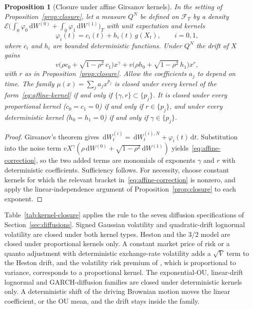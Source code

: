 \documentclass[11pt,a4paper]{article}
\newtheorem{proposition}{Proposition}[section]
\theoremstyle{definition}
\theoremstyle{remark}
\newcommand{\dd}{\,\mathrm{d}}
\begin{document}
\begin{proposition}[Closure under affine Girsanov kernels]
\label{prop:affine-closure}
In the setting of Proposition~\ref{prop:closure}, let a measure \(Q^N\) be defined on \(\mathcal F_T\) by a density
\(\mathcal E\bigl(\int_0^\cdot\varphi_0\dd W^{(0)}+\int_0^\cdot\varphi_1\dd W^{(1)}\bigr)_T\) with unit expectation and kernels
\begin{equation}
 \varphi_i(t)=c_i(t)+h_i(t)\,g(X_t),\qquad i=0,1,
 \label{eq:affine-kernel}
\end{equation}
where \(c_i\) and \(h_i\) are bounded deterministic functions. Under \(Q^N\) the drift of \(X\) gains
\begin{equation}
 v\bigl(\rho c_0+\sqrt{1-\rho^2}\,c_1\bigr)x^{\gamma}
 +v\bigl(\rho h_0+\sqrt{1-\rho^2}\,h_1\bigr)x^{r},
 \label{eq:affine-correction}
\end{equation}
with \(r\) as in Proposition~\ref{prop:closure}. Allow the coefficients \(a_j\) to depend on time. The family \(\mu(x)=\sum_ja_jx^{p_j}\) is closed under every kernel of the form~\eqref{eq:affine-kernel} if and only if \(\{\gamma,r\}\subset\{p_j\}\). It is closed under every proportional kernel (\(c_0=c_1=0\)) if and only if \(r\in\{p_j\}\), and under every deterministic kernel (\(h_0=h_1=0\)) if and only if \(\gamma\in\{p_j\}\).
\end{proposition}

\begin{proof}
Girsanov's theorem gives \(\dd W_t^{(i)}=\dd W_t^{(i),N}+\varphi_i(t)\dd t\). Substitution into the noise term \(vX^{\gamma}(\rho\dd W^{(0)}+\sqrt{1-\rho^2}\dd W^{(1)})\) yields~\eqref{eq:affine-correction}, so the two added terms are monomials of exponents \(\gamma\) and \(r\) with deterministic coefficients. Sufficiency follows. For necessity, choose constant kernels for which the relevant bracket in~\eqref{eq:affine-correction} is nonzero, and apply the linear-independence argument of Proposition~\ref{prop:closure} to each exponent.
\end{proof}

Table~\ref{tab:kernel-closure} applies the rule to the seven diffusion specifications of Section~\ref{sec:diffusions}. Signed Gaussian volatility and quadratic-drift lognormal volatility are closed under both kernel types. Heston and the 3/2 model are closed under proportional kernels only. A constant market price of risk or a quanto adjustment with deterministic exchange-rate volatility adds a \(\sqrt V\) term to the Heston drift, and the volatility risk premium of \citet{Heston1993}, which is proportional to variance, corresponds to a proportional kernel. The exponential-OU, linear-drift lognormal and GARCH-diffusion families are closed under deterministic kernels only. A deterministic shift of the driving Brownian motion moves the linear coefficient, or the OU mean, and the drift stays inside the family.
\end{document}
